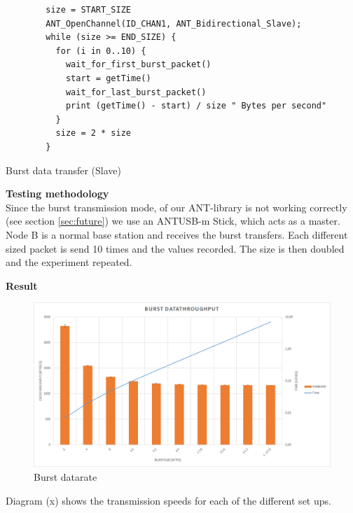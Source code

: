 \begin{description}
	\begin{code}
		\begin{verbatim}
		size = START_SIZE
		ANT_OpenChannel(ID_CHAN1, ANT_Bidirectional_Slave);		
		while (size >= END_SIZE) {
		  for (i in 0..10) {
		    wait_for_first_burst_packet()
		    start = getTime()
		    wait_for_last_burst_packet()
		    print (getTime() - start) / size " Bytes per second"
		  }
		  size = 2 * size
		}
		\end{verbatim}
		\caption{Burst data transfer (Slave)}\label{lst:sExp5}
	\end{code}
	\item{\textbf{Testing methodology}} \hfill \\ Since the burst transmission mode, of our ANT-library is not working correctly (see section \ref{sec:future}) we use an ANTUSB-m Stick, which acts as a master. Node B is a normal base station and receives the burst transfers. Each different sized packet is send 10 times and the values recorded. The size is then doubled and the experiment repeated.
	\item{\textbf{Result}} \hfill \\ 
		\begin{figure}[h]
			\centering
			\includegraphics[scale=0.5]{./pics/exp5.png}
			\caption{Burst datarate}\label{fig:exp5}
		\end{figure}
	 Diagram (x) shows the transmission speeds for each of the different set ups.
\end{description}
\newpage

